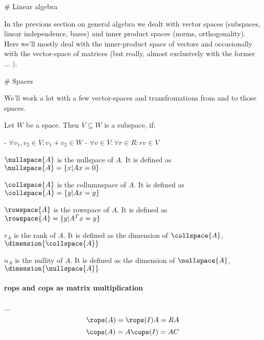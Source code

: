 # Linear algebra

In the previous section on general algebra we dealt with vector spaces (subspaces, linear independence, bases) and inner product spaces (norms, orthogonality). 
Here we'll mostly deal with the inner-product space of vectors and occasionally with the vector-space of matrices (but really, almost exclusively with the former ... ).




# Spaces

We'll work a lot with a few vector-spaces and transfromations from and to those spaces. 

\begin{definition}
    Let $W$ be a space. Then $V \subseteq W$ is a subspace, if: 
    
        - $\forall v_1, v_2 \in V: v_1 + v_2 \in W$
        - $\forall v \in V: \forall r \in R: rv \in V$
    
\end{definition}
    

\begin{definition}[Nullspace]
     $\nullspace{A}$ is the nullspace of $A$. It is defined as $\nullspace{A} = \{ x | Ax = 0 \}$
\end{definition}

\begin{definition}[Columnspace]
     $\collspace{A}$ is the collumnspace of $A$. It is defined as $\collspace{A} = \{ y | Ax = y \}$
\end{definition}

\begin{definition}[Rowspace]
     $\rowspace{A}$ is the rowspace of $A$. It is defined as $\rowspace{A} = \{ y | A^Tx = y \}$
\end{definition}

\begin{definition}[Rank]
     $r_A$ is the rank of $A$. It is defined as the dimension of $\collspace{A}$, $\dimension{\collspace{A}}$
\end{definition}

\begin{definition}[Nullity]
    $n_A$ is the nullity of $A$. It is defined as the dimension of $\nullspace{A}$, $\dimension{\nullspace{A}}$
\end{definition}


\paragraph{rops and cops as matrix multiplication} ...
$$ \rops(A) = \rops(I) A = R A$$
$$ \cops(A) = A \cops(I) = A C$$


